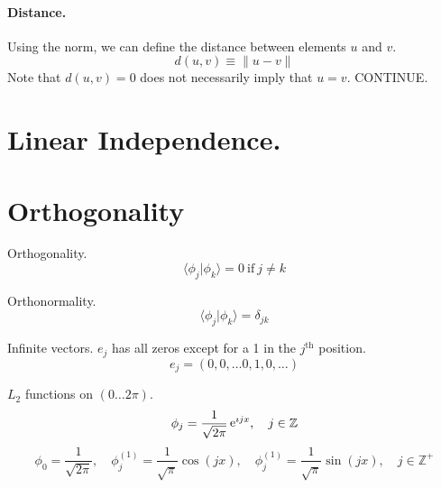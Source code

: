 

\paragraph{Distance.}
Using the norm, we can define the distance between elements $u$ and $v$.
\[
d(u,v) \equiv \|u - v \|
\]
Note that $d(u,v) = 0$ does not necessarily imply that $u = v$.
CONTINUE.



\section{Linear Independence.}





\section{Orthogonality}


Orthogonality.
\[
\langle \phi_j | \phi_k \rangle = 0\ \mathrm{if}\ j \neq k
\]

Orthonormality.
\[
\langle \phi_j | \phi_k \rangle = \delta_{j k}
\]



\begin{Example}
  Infinite vectors.
  $e_j$ has all zeros except for a 1 in the $j^{\mathrm{th}}$ position. 
  \[
  e_j = (0, 0, \ldots 0, 1, 0, \ldots)
  \]
\end{Example}



\begin{Example}
  $L_2$ functions on $(0 \ldots 2 \pi)$.
  \[
  \phi_j = \frac{1}{\sqrt{2\pi}} \mathop{\mathrm{e}}\nolimits^{\imath j x}, \quad j \in \mathbb{Z}
  \]
  \[
  \phi_0 = \frac{1}{\sqrt{2\pi}}, \quad
  \phi_j^{(1)} = \frac{1}{\sqrt{\pi}} \cos(j x), \quad
  \phi_j^{(1)} = \frac{1}{\sqrt{\pi}} \sin(j x), \quad j \in \mathbb{Z}^+
  \]
\end{Example}



